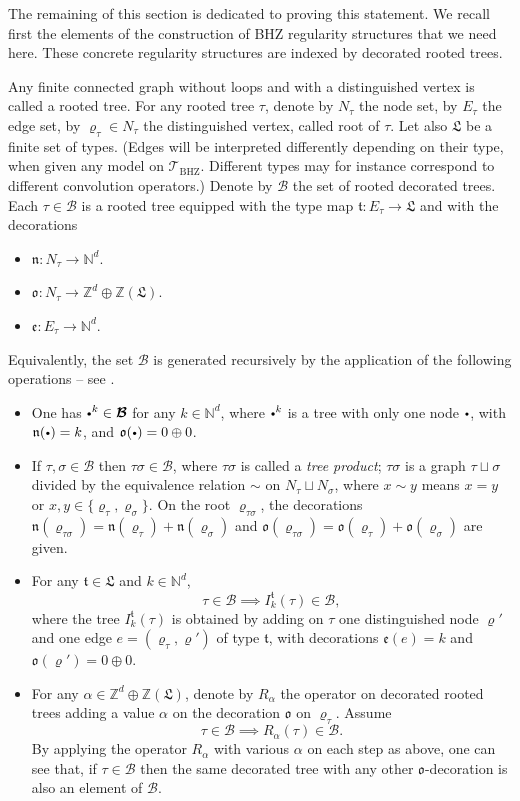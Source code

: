 \documentclass[10pt]{amsart}
\newcommand{\sbullet}{{\scriptscriptstyle\bullet}}
\newcommand{\scbullet}{{\raisebox{1pt}{$\sbullet$}}}
\theoremstyle{plain}
\theoremstyle{definition}
\newcommand{\BHZ}{{\scriptscriptstyle\mathrm{BHZ}}}
\newcommand{\bsmcB}{\boldsymbol{\mathcal{B}}}
\newcommand{\scrT}{\mathscr{T}}
\newcommand{\frkL}{\mathfrak{L}}
\newcommand{\frkt}{\mathfrak{t}}
\newcommand{\frkn}{\mathfrak{n}}
\newcommand{\frko}{\mathfrak{o}}
\newcommand{\frke}{\mathfrak{e}}
\newcommand{\bbN}{\mathbb{N}}
\newcommand{\bbZ}{\mathbb{Z}}
\begin{document}
The remaining of this section is dedicated to proving this statement. We recall first the elements of the construction of BHZ regularity structures that we need here. These concrete regularity structures are indexed by decorated rooted trees.

Any finite connected graph without loops and with a distinguished vertex is called a rooted tree. For any rooted tree $\tau$, denote by $N_\tau$ the node set, by $E_\tau$ the edge set, by $\varrho_\tau\in N_\tau$ the distinguished vertex, called root of $\tau$. Let also $\frkL$ be a finite set of types. (Edges will be interpreted differently depending on their type, when given any model on $\scrT_{\BHZ}$. Different types may for instance correspond to different convolution operators.) Denote by $\bsmcB$ the set of rooted decorated trees. Each $\tau\in\bsmcB$ is a rooted tree equipped with the type map $\frkt:E_\tau\to\frkL$ and with the decorations
\begin{itemize}
\item $\frkn:N_\tau\to\bbN^d$.
\item $\frko:N_\tau\to\bbZ^d\oplus\bbZ(\frkL)$.
\item $\frke:E_\tau\to\bbN^d$.
\end{itemize}
Equivalently, the set $\bsmcB$ is generated recursively by the application of the following operations -- see \cite[\S 4.3]{BHZ}.
\begin{itemize}
\item One has $\scbullet^k\in\bsmcB$ for any $k\in\bbN^d$, where $\scbullet^k$ is a tree with only one node $\scbullet$, with $\frkn(\scbullet)=k$, and $\frko(\scbullet)=0\oplus0$.
\item If $\tau,\sigma\in\bsmcB$ then $\tau\sigma\in\bsmcB$, where $\tau\sigma$ is called a \emph{tree product}; $\tau\sigma$ is a graph $\tau\sqcup\sigma$ divided by the equivalence relation $\sim$ on $N_\tau\sqcup N_\sigma$, where $x\sim y$ means $x=y$ or $x,y\in\{\varrho_\tau,\varrho_\sigma\}$. On the root $\varrho_{\tau\sigma}$, the decorations $\frkn(\varrho_{\tau\sigma})=\frkn(\varrho_\tau)+\frkn(\varrho_\sigma)$ and $\frko(\varrho_{\tau\sigma})=\frko(\varrho_\tau)+\frko(\varrho_\sigma)$ are given.
\item For any $\frkt\in\frkL$ and $k\in\bbN^d$,
\[
\tau\in\bsmcB\implies I_k^\frkt(\tau)\in\bsmcB,
\]
where the tree $I_k^\frkt(\tau)$ is obtained by adding on $\tau$ one distinguished node $\varrho'$ and one edge $e=(\varrho_\tau,\varrho')$ of type $\frkt$, with decorations $\frke(e)=k$ and $\frko(\varrho')=0\oplus0$.
\item For any $\alpha\in\bbZ^d\oplus\bbZ(\frkL)$, denote by $R_\alpha$ the operator on decorated rooted trees adding a value $\alpha$ on the decoration $\frko$ on $\varrho_\tau$. Assume
\[
\tau\in\bsmcB \implies R_\alpha(\tau)\in\bsmcB.
\]
By applying the operator $R_\alpha$ with various $\alpha$ on each step as above, one can see that, if $\tau\in\bsmcB$ then the same decorated tree with any other $\frko$-decoration is also an element of $\bsmcB$.
\end{itemize}
\end{document}
